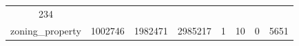 \documentclass[]{book}
\theoremstyle{definition}
\theoremstyle{definition}
\theoremstyle{definition}
\theoremstyle{remark}
\begin{document}
\begin{longtable}[]{@{}cccccccc@{}}
\begin{minipage}[t]{0.09\columnwidth}
234\strut
\end{minipage}\tabularnewline
\begin{minipage}[t]{0.23\columnwidth}\centering\strut
zoning\_property\strut
\end{minipage} & \begin{minipage}[t]{0.09\columnwidth}\centering\strut
1002746\strut
\end{minipage} & \begin{minipage}[t]{0.10\columnwidth}\centering\strut
1982471\strut
\end{minipage} & \begin{minipage}[t]{0.09\columnwidth}\centering\strut
2985217\strut
\end{minipage} & \begin{minipage}[t]{0.05\columnwidth}\centering\strut
1\strut
\end{minipage} & \begin{minipage}[t]{0.05\columnwidth}\centering\strut
10\strut
\end{minipage} & \begin{minipage}[t]{0.07\columnwidth}\centering\strut
0\strut
\end{minipage} & \begin{minipage}[t]{0.09\columnwidth}\centering\strut
5651\strut
\end{minipage}\tabularnewline
\bottomrule
\end{longtable}
\end{document}
